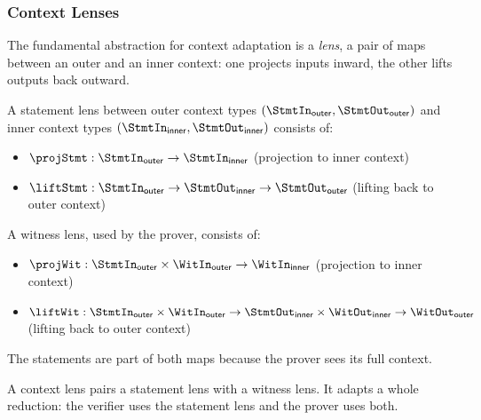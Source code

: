 \subsubsection{Context Lenses}

The fundamental abstraction for context adaptation is a \emph{lens}, a pair of maps between an outer
and an inner context: one projects inputs inward, the other lifts outputs back outward.

\begin{definition}
    \label{def:statement_lens}
    A statement lens between outer context types $(\StmtIn_{\mathsf{outer}}, \StmtOut_{\mathsf{outer}})$ and inner context types $(\StmtIn_{\mathsf{inner}}, \StmtOut_{\mathsf{inner}})$ consists of:
    \begin{itemize}
        \item $\projStmt : \StmtIn_{\mathsf{outer}} \to \StmtIn_{\mathsf{inner}}$ (projection to inner context)
        \item $\liftStmt : \StmtIn_{\mathsf{outer}} \to \StmtOut_{\mathsf{inner}} \to \StmtOut_{\mathsf{outer}}$ (lifting back to outer context)
    \end{itemize}
    \leanok
\end{definition}

\begin{definition}
    \label{def:witness_lens}
    A witness lens, used by the prover, consists of:
    \begin{itemize}
        \item $\projWit : \StmtIn_{\mathsf{outer}} \times \WitIn_{\mathsf{outer}} \to \WitIn_{\mathsf{inner}}$ (projection to inner context)
        \item $\liftWit : \StmtIn_{\mathsf{outer}} \times \WitIn_{\mathsf{outer}} \to \StmtOut_{\mathsf{inner}} \times \WitOut_{\mathsf{inner}} \to \WitOut_{\mathsf{outer}}$ (lifting back to outer context)
    \end{itemize}
    The statements are part of both maps because the prover sees its full context.
    \leanok
\end{definition}

\begin{definition}
    \label{def:context_lens}
    A context lens pairs a statement lens with a witness lens. It adapts a whole reduction: the
    verifier uses the statement lens and the prover uses both.
    \leanok
\end{definition}

